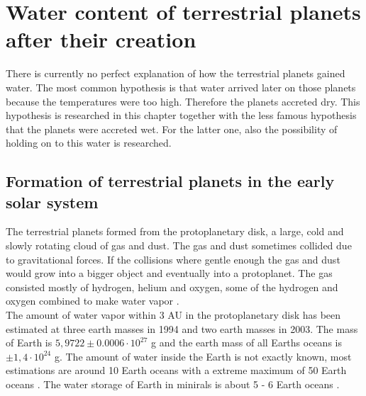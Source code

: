 \section{Water content of terrestrial planets after their creation}
There is currently no perfect explanation of how the terrestrial planets gained water. The most common hypothesis is that water arrived later on those planets because the temperatures were too high. Therefore the planets accreted dry. This hypothesis is researched in this chapter together with the less famous hypothesis that the planets were accreted wet. For the latter one, also the possibility of holding on to this water is researched.


\subsection{Formation of terrestrial planets in the early solar system}
The terrestrial planets formed from the protoplanetary disk, a large, cold and slowly rotating cloud of gas and dust. The gas and dust sometimes collided due to gravitational forces. If the collisions where gentle enough the gas and dust would grow into a bigger object and eventually into a protoplanet. The gas consisted mostly of hydrogen, helium and oxygen, some of the hydrogen and oxygen combined to make water vapor \cite[p.~523]{TPoriginWater}.\\

The amount of water vapor within 3 AU in the protoplanetary disk has been estimated at three earth masses \cite{TPLecluse} in 1994 and two earth masses \cite{TPPalme} \cite{TPLodders} in 2003. The mass of Earth is $5,9722 \pm 0.0006 \cdot 10^{27}$ g and the earth mass of all Earths oceans is $\pm 1,4 \cdot 10^{24}$ g. The amount of water inside the Earth is not exactly known, most estimations are around 10 Earth oceans with a extreme maximum of 50 Earth oceans \cite[p.~523]{TPoriginWater}. The water storage of Earth in minirals is about 5 - 6 Earth oceans \cite{TPOhtani}.\\

